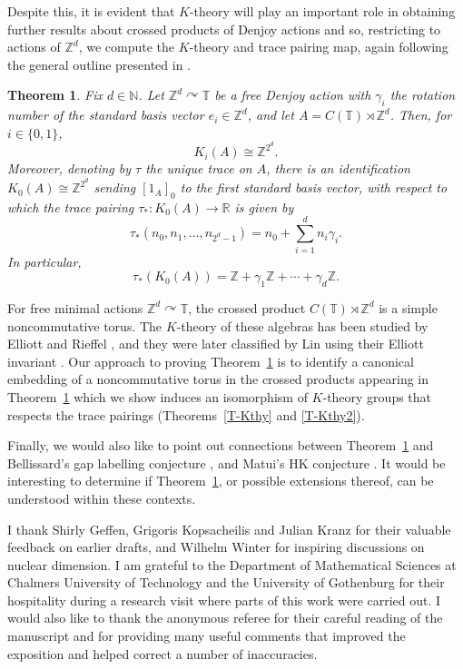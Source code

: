 \documentclass[11pt,a4paper,leqno]{amsart}
\theoremstyle{definition}
\theoremstyle{remark}
\numberwithin{equation}{section}
\theoremstyle{plain}
\newcounter{theoremintro}
\newtheorem{theoremi}[theoremintro]{Theorem}
\newcommand{\Nb}{\mathbb{N}}
\newcommand{\Zb}{\mathbb{Z}}
\newcommand{\Tb}{\mathbb{T}}
\newcommand{\Rb}{\mathbb{R}}
\begin{document}
Despite this, it is evident that $K$-theory will play an important role in obtaining further results about crossed products of Denjoy actions and so, restricting to actions of $\Zb^d$, we compute the $K$-theory and trace pairing map, again following the general outline presented in \cite{PutSchSka86}. 

\begin{theoremi}\label{T-Kthyi}
	Fix $d\in \Nb$. Let $\Zb^d \curvearrowright \Tb$ be a free Denjoy action with $\gamma_i$ the rotation number of the standard basis vector $e_i \in \Zb^d$, and let $A = C(\Tb) \rtimes \Zb^d$. Then, for $i\in \{0,1\}$,  
	\[
		K_i(A) \cong \Zb^{2^d}.
	\]	
	Moreover, denoting by $\tau$ the unique trace on $A$, there is an identification $K_0(A)\cong \Zb^{2^d}$ sending $[1_A]_0$ to the first standard basis vector, with respect to which the trace pairing $\tau_* : K_0(A) \to \Rb$ is given by 
	\[
		\tau_*(n_0,n_1,\ldots,n_{2^d - 1}) = n_0 + \sum_{i=1}^d n_i \gamma_i.	
	\]
	In particular,
	\[
		\tau_*(K_0(A)) = \Zb + \gamma_1\Zb + \cdots + \gamma_d \Zb.
	\] 
\end{theoremi}

For free minimal actions $\Zb^d\curvearrowright \Tb$, the crossed product $C(\Tb)\rtimes \Zb^d$ is a simple noncommutative torus. The $K$-theory of these algebras has been studied by Elliott \cite{Ell84} and Rieffel \cite{Rie88}, and they were later classified by Lin using their Elliott invariant \cite{Lin03}. Our approach to proving Theorem~\ref{T-Kthyi} is to identify a canonical embedding of a noncommutative torus in the crossed products appearing in Theorem~\ref{T-Kthyi} which we show induces an isomorphism of $K$-theory groups that respects the trace pairings (Theorems~\ref{T-Kthy} and \ref{T-Kthy2}). 

Finally, we would also like to point out connections between Theorem~\ref{T-Kthyi} and Bellissard's gap labelling conjecture \cite{Bel86}, and Matui's HK conjecture \cite{Mat15}. It would be interesting to determine if Theorem~\ref{T-Kthyi}, or possible extensions thereof, can be understood within these contexts. 

\medskip
{} I thank Shirly Geffen, Grigoris Kopsacheilis and Julian Kranz for their valuable feedback on earlier drafts, and Wilhelm Winter for inspiring discussions on nuclear dimension. I am grateful to the Department of Mathematical Sciences at Chalmers University of Technology and the University of Gothenburg for their hospitality during a research visit where parts of this work were carried out. I would also like to thank the anonymous referee for their careful reading of the manuscript and for providing many useful comments that improved the exposition and helped correct a number of inaccuracies.
\end{document}
